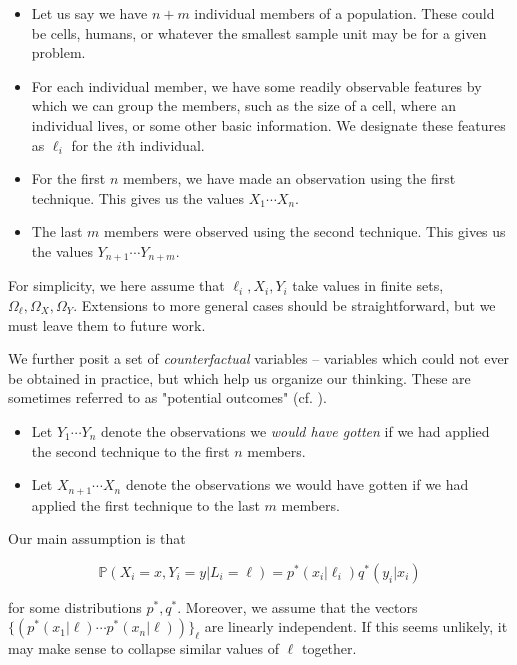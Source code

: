 \begin{itemize}
\item Let us say we have $n+m$ individual members of a population.  These could be cells, humans, or whatever the smallest sample unit may be for a given problem.
\item For each individual member, we have some readily observable features by which we can group the members, such as the size of a cell, where an individual lives, or some other basic information.  We designate these features as $\ell_i$ for the $i$th individual.
\item For the first $n$ members, we have made an observation using the first technique.  This gives us the values $X_1 \cdots X_n$.
\item The last $m$ members were observed using the second technique.  This gives us the values $Y_{n+1} \cdots Y_{n+m}$.
\end{itemize}

For simplicity, we here assume that $\ell_i,X_i,Y_i$ take values in finite sets, $\Omega_\ell,\Omega_X,\Omega_Y$.  Extensions to more general cases should be straightforward, but we must leave them to future work.  

We further posit a set of \emph{counterfactual} variables -- variables which could not ever be obtained in practice, but which help us organize our thinking.  These are sometimes referred to as "potential outcomes"  (cf. \cite{rubin2005causal}).

\begin{itemize}
\item Let $Y_1 \cdots Y_n$ denote the observations we \emph{would have gotten} if we had applied the second technique to the first $n$ members.
\item Let $X_{n+1} \cdots X_n$ denote the observations we would have gotten if we had applied the first technique to the last $m$ members. 
\end{itemize}

Our main assumption is that 

\begin{equation}
\mathbb{P}(X_i=x,Y_i=y|L_i=\ell)=p^*(x_i|\ell_i)q^*(y_i|x_i)
\end{equation}

for some distributions $p^*,q^*$.  Moreover, we assume that the vectors $\{(p^*(x_1|\ell)\cdots p^*(x_n|\ell))\}_\ell$ are linearly independent.  If this seems unlikely, it may make sense to collapse similar values of $\ell$ together.

